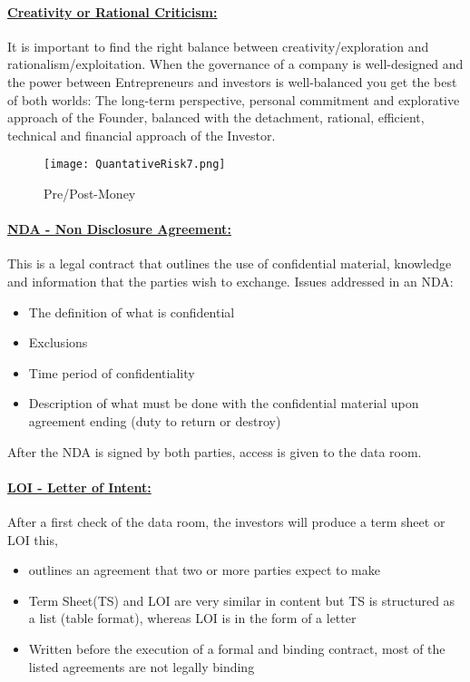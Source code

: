 \documentclass[8pt]{extreport}
\begin{document}
{\paragraph{\underline{Creativity or Rational Criticism:}} It is important to find the right balance between creativity/exploration and rationalism/exploitation. When the governance of a company is well-designed and the power between Entrepreneurs and investors is well-balanced you get the best of both worlds: The long-term perspective, personal commitment and explorative approach of the Founder, balanced with the detachment, rational, efficient, technical and financial approach of the Investor.
\begin{figure}[h!]
  \centering\texttt{[image: QuantativeRisk7.png]}
  \caption{Pre/Post-Money}
  \label{scenarioList}
\end{figure}


\paragraph{\underline{NDA - Non Disclosure Agreement:}} This is a legal contract that outlines the use of confidential material, knowledge and information that the parties wish to exchange. Issues addressed in an NDA:
\begin{itemize}
\item The definition of what is confidential
\item Exclusions
\item Time period of confidentiality
\item Description of what must be done with the confidential material upon agreement ending (duty to return or destroy)
\end{itemize}
After the NDA is signed by both parties, access is given to the data room.
\paragraph{\underline{LOI - Letter of Intent:}} After a first check of the data room, the investors will produce a term sheet or LOI this,
\begin{itemize}
\item outlines an agreement that two or more parties expect to make
\item Term Sheet(TS) and LOI are very similar in content but TS is structured as a list (table format), whereas LOI is in the form of a letter
\item Written before the execution of a formal and binding contract, most of the listed agreements are not legally binding
\end{itemize}
}
\end{document}
